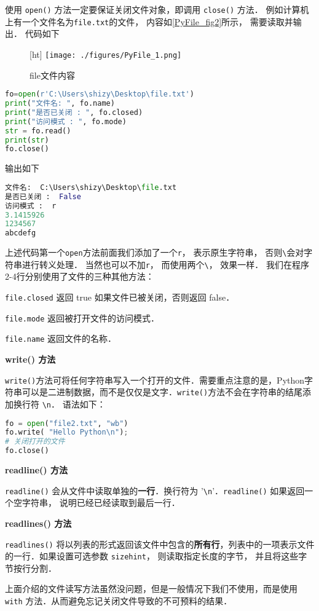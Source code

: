使用 \verb|open()| 方法一定要保证关闭文件对象，即调用 \verb|close()| 方法． 例如计算机上有一个文件名为\verb|file.txt|的文件， 内容如\autoref{PyFile_fig2}所示， 需要读取并输出． 代码如下
\begin{figure}\label{PyFile_fig2}[ht]
\centering
\texttt{[image: ./figures/PyFile\_1.png]}
\caption{file文件内容} \label{PyFile_fig1}
\end{figure}
\begin{lstlisting}[language=python]
fo=open(r'C:\Users\shizy\Desktop\file.txt')
print("文件名: ", fo.name)
print("是否已关闭 : ", fo.closed)
print("访问模式 : ", fo.mode)
str = fo.read()
print(str)
fo.close()
\end{lstlisting}
输出如下
\begin{lstlisting}[language=python]
文件名:  C:\Users\shizy\Desktop\file.txt
是否已关闭 :  False
访问模式 :  r
3.1415926
1234567
abcdefg
\end{lstlisting}
上述代码第一个\verb|open|方法前面我们添加了一个\verb|r|， 表示原生字符串， 否则\verb|\|会对字符串进行转义处理． 当然也可以不加\verb|r|， 而使用两个\verb|\|， 效果一样． 我们在程序2-4行分别使用了文件的三种其他方法：

\verb|file.closed| 返回 true 如果文件已被关闭，否则返回 false．

\verb|file.mode| 返回被打开文件的访问模式．

\verb|file.name| 返回文件的名称．


\textbf{write() 方法}

\verb|write()|方法可将任何字符串写入一个打开的文件．需要重点注意的是，Python字符串可以是二进制数据，而不是仅仅是文字．\verb|write()|方法不会在字符串的结尾添加换行符 \verb|\n|． 语法如下：
\begin{lstlisting}[language=python]
fo = open("file2.txt", "wb")
fo.write( "Hello Python\n");
# 关闭打开的文件
fo.close()
\end{lstlisting}

\textbf{readline() 方法}

\verb|readline()| 会从文件中读取单独的\textbf{一行}．换行符为 '\verb|\n|'．\verb|readline()| 如果返回一个空字符串， 说明已经已经读取到最后一行．

\textbf{readlines() 方法}

\verb|readlines()| 将以列表的形式返回该文件中包含的\textbf{所有行}，列表中的一项表示文件的一行．如果设置可选参数 \verb|sizehint|， 则读取指定长度的字节， 并且将这些字节按行分割．

上面介绍的文件读写方法虽然没问题，但是一般情况下我们不使用，而是使用\verb|with| 方法．从而避免忘记关闭文件导致的不可预料的结果．



